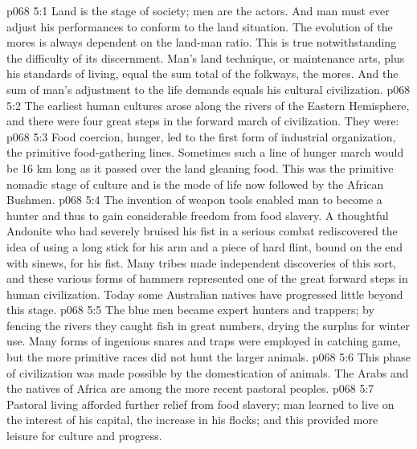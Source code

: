 \vs p068 5:1 Land is the stage of society; men are the actors. And man must ever adjust his performances to conform to the land situation. The evolution of the mores is always dependent on the land\hyp{}man ratio. This is true notwithstanding the difficulty of its discernment. Man’s land technique, or maintenance arts, plus his standards of living, equal the sum total of the folkways, the mores. And the sum of man’s adjustment to the life demands equals his cultural civilization.
\vs p068 5:2 The earliest human cultures arose along the rivers of the Eastern Hemisphere, and there were four great steps in the forward march of civilization. They were:
\vs p068 5:3 \bibnobreakspace {} Food coercion, hunger, led to the first form of industrial organization, the primitive food\hyp{}gathering lines. Sometimes such a line of hunger march would be 16 km long as it passed over the land gleaning food. This was the primitive nomadic stage of culture and is the mode of life now followed by the African Bushmen.
\vs p068 5:4 \bibnobreakspace {} The invention of weapon tools enabled man to become a hunter and thus to gain considerable freedom from food slavery. A thoughtful Andonite who had severely bruised his fist in a serious combat rediscovered the idea of using a long stick for his arm and a piece of hard flint, bound on the end with sinews, for his fist. Many tribes made independent discoveries of this sort, and these various forms of hammers represented one of the great forward steps in human civilization. Today some Australian natives have progressed little beyond this stage.
\vs p068 5:5 The blue men became expert hunters and trappers; by fencing the rivers they caught fish in great numbers, drying the surplus for winter use. Many forms of ingenious snares and traps were employed in catching game, but the more primitive races did not hunt the larger animals.
\vs p068 5:6 \bibnobreakspace {} This phase of civilization was made possible by the domestication of animals. The Arabs and the natives of Africa are among the more recent pastoral peoples.
\vs p068 5:7 Pastoral living afforded further relief from food slavery; man learned to live on the interest of his capital, the increase in his flocks; and this provided more leisure for culture and progress.

